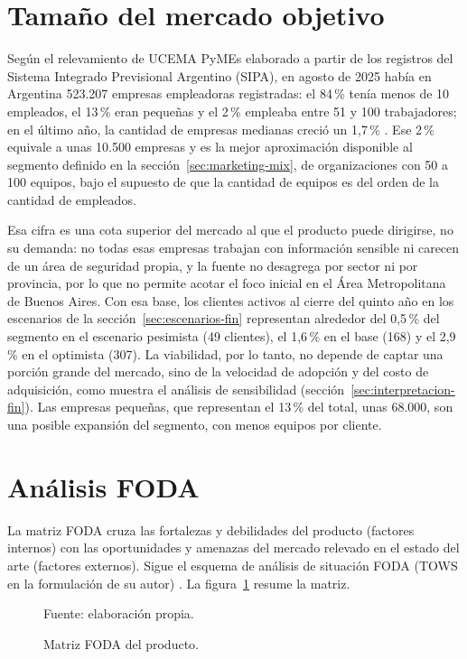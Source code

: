 \section{Tamaño del mercado objetivo}\label{sec:tamano-mercado}
Según el relevamiento de UCEMA PyMEs elaborado a partir de los registros del Sistema Integrado Previsional Argentino (SIPA), en agosto de 2025 había en Argentina 523.207 empresas empleadoras registradas: el 84\,\% tenía menos de 10 empleados, el 13\,\% eran pequeñas y el 2\,\% empleaba entre 51 y 100 trabajadores; en el último año, la cantidad de empresas medianas creció un 1,7\,\% \parencite{Salerno2025}. Ese 2\,\% equivale a unas 10.500 empresas y es la mejor aproximación disponible al segmento definido en la sección~\ref{sec:marketing-mix}, de organizaciones con 50 a 100 equipos, bajo el supuesto de que la cantidad de equipos es del orden de la cantidad de empleados.

Esa cifra es una cota superior del mercado al que el producto puede dirigirse, no su demanda: no todas esas empresas trabajan con información sensible ni carecen de un área de seguridad propia, y la fuente no desagrega por sector ni por provincia, por lo que no permite acotar el foco inicial en el Área Metropolitana de Buenos Aires. Con esa base, los clientes activos al cierre del quinto año en los escenarios de la sección~\ref{sec:escenarios-fin} representan alrededor del 0,5\,\% del segmento en el escenario pesimista (49 clientes), el 1,6\,\% en el base (168) y el 2,9\,\% en el optimista (307). La viabilidad, por lo tanto, no depende de captar una porción grande del mercado, sino de la velocidad de adopción y del costo de adquisición, como muestra el análisis de sensibilidad (sección~\ref{sec:interpretacion-fin}). Las empresas pequeñas, que representan el 13\,\% del total, unas 68.000, son una posible expansión del segmento, con menos equipos por cliente.

\section{Análisis FODA}
La matriz FODA cruza las fortalezas y debilidades del producto (factores internos) con las oportunidades y amenazas del mercado relevado en el estado del arte (factores externos). Sigue el esquema de análisis de situación FODA (TOWS en la formulación de su autor) \parencite{Weihrich1982}. La figura~\ref{fig:matriz-foda} resume la matriz.

\begin{figure}[h]
	\centering
	
	\caption{Matriz FODA del producto.}
	\label{fig:matriz-foda}
	{\small Fuente: elaboración propia.\par}
\end{figure}
\FloatBarrier

